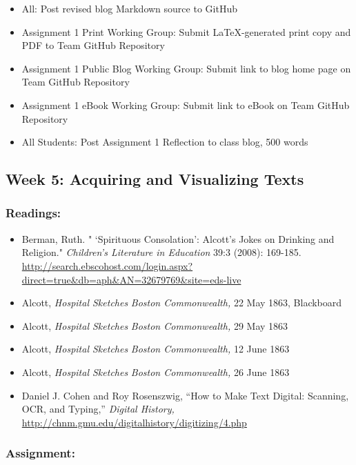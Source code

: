 \documentclass[]{article}
\begin{document}
\begin{itemize}
\itemsep1pt\parskip0pt
\item
  All: Post revised blog Markdown source to GitHub
\item
  Assignment 1 Print Working Group: Submit LaTeX-generated print copy
  and PDF to Team GitHub Repository
\item
  Assignment 1 Public Blog Working Group: Submit link to blog home page
  on Team GitHub Repository
\item
  Assignment 1 eBook Working Group: Submit link to eBook on Team GitHub
  Repository
\item
  All Students: Post Assignment 1 Reflection to class blog, 500 words
\end{itemize}

\subsection{Week 5: Acquiring and Visualizing
Texts}\label{week-5-acquiring-and-visualizing-texts}

\subsubsection{Readings:}\label{readings-3}

\begin{itemize}
\itemsep1pt\parskip0pt
\item
  Berman, Ruth. " `Spirituous Consolation': Alcott's Jokes on Drinking
  and Religion." \emph{Children's Literature in Education} 39:3 (2008):
  169-185.
  \url{http://search.ebscohost.com/login.aspx?direct=true\&db=aph\&AN=32679769\&site=eds-live}
\item
  Alcott, \emph{Hospital Sketches} \emph{Boston Commonwealth,} 22 May
  1863, Blackboard
\item
  Alcott, \emph{Hospital Sketches} \emph{Boston Commonwealth,} 29 May
  1863
\item
  Alcott, \emph{Hospital Sketches} \emph{Boston Commonwealth,} 12 June
  1863
\item
  Alcott, \emph{Hospital Sketches} \emph{Boston Commonwealth,} 26 June
  1863
\item
  Daniel J. Cohen and Roy Rosenszwig, ``How to Make Text Digital:
  Scanning, OCR, and Typing,'' \emph{Digital History,}
  \url{http://chnm.gmu.edu/digitalhistory/digitizing/4.php}
\end{itemize}

\subsubsection{Assignment:}\label{assignment-3}
\end{document}
